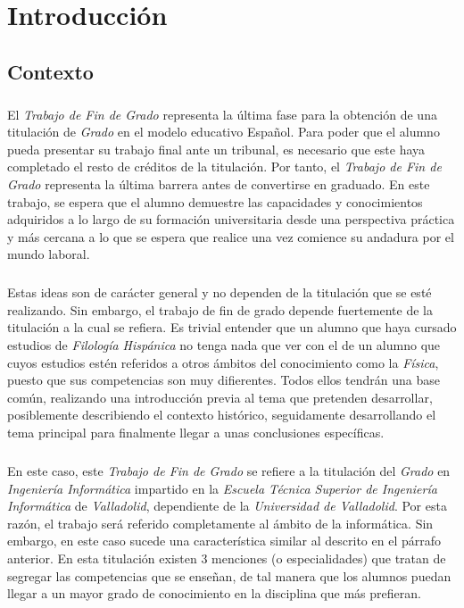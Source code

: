 \documentclass{subfiles}
\begin{document}
  \chapter{Introducción}
  \label{chap:intro}

    \section{Contexto}
    \label{sec:introduction_context}

      \paragraph{}
      El \emph{Trabajo de Fin de Grado} representa la última fase para la obtención de una titulación de \emph{Grado} en el modelo educativo Español. Para poder que el alumno pueda presentar su trabajo final ante un tribunal, es necesario que este haya completado el resto de créditos de la titulación. Por tanto, el \emph{Trabajo de Fin de Grado} representa la última barrera antes de convertirse en graduado. En este trabajo, se espera que el alumno demuestre las capacidades y conocimientos adquiridos a lo largo de su formación universitaria desde una perspectiva práctica y más cercana a lo que se espera que realice una vez comience su andadura por el mundo laboral.

      \paragraph{}
      Estas ideas son de carácter general y no dependen de la titulación que se esté realizando. Sin embargo, el trabajo de fin de grado depende fuertemente de la titulación a la cual se refiera. Es trivial entender que un alumno que haya cursado estudios de \emph{Filología Hispánica} no tenga nada que ver con el de un alumno que cuyos estudios estén referidos a otros ámbitos del conocimiento como la \emph{Física}, puesto que sus competencias son muy difierentes. Todos ellos tendrán una base común, realizando una introducción previa al tema que pretenden desarrollar, posiblemente describiendo el contexto histórico, seguidamente desarrollando el tema principal para finalmente llegar a unas conclusiones específicas.

      \paragraph{}
      En este caso, este \emph{Trabajo de Fin de Grado} se refiere a la titulación del \emph{Grado} en \emph{Ingeniería Informática} impartido en la \emph{Escuela Técnica Superior de Ingeniería Informática} de \emph{Valladolid}, dependiente de la \emph{Universidad de Valladolid}. Por esta razón, el trabajo será referido completamente al ámbito de la informática. Sin embargo, en este caso sucede una característica similar al descrito en el párrafo anterior. En esta titulación existen 3 menciones (o especialidades) que tratan de segregar las competencias que se enseñan, de tal manera que los alumnos puedan llegar a un mayor grado de conocimiento en la disciplina que más prefieran.
\end{document}
